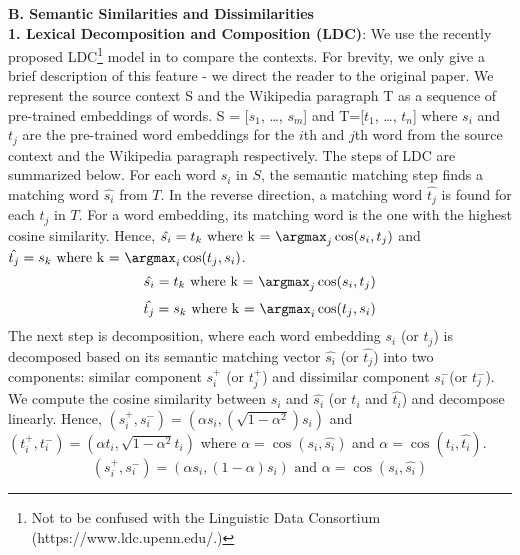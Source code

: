 \documentclass[letterpaper]{article} \usepackage{aaai18}  \usepackage{times}  \usepackage{helvet}  \usepackage{courier}  \usepackage{url}  \usepackage{graphicx}  \frenchspacing  \setlength{\pdfpagewidth}{8.5in}  \setlength{\pdfpageheight}{11in}  \usepackage{latexsym}
\DeclareMathOperator{\cosine}{cos}
\newcommand{\ct}{S}
\newcommand{\wpf}{T}
\newcommand{\cti}{s}
\newcommand{\wpfi}{t}
\begin{document}
\textbf{B. Semantic Similarities and Dissimilarities}\\
\textbf{1. Lexical Decomposition and Composition (LDC)}: We use the recently proposed LDC\footnote{Not to be confused with the Linguistic Data Consortium (https://www.ldc.upenn.edu/.)} model in \cite{wang2016sentence} to compare the contexts. For brevity, we only give a brief description of this feature - we direct the reader to the original paper. We represent the source context \ct{} and the Wikipedia paragraph \wpf{} as a sequence of pre-trained embeddings of words. \ct{} = [$\cti{}_1$, \ldots, $\cti{}_m$] and \wpf{}=[$\wpfi{}_1$, \ldots, $\wpfi{}_n$] where $\cti{}_i$ and $\wpfi{}_j$ are the pre-trained word embeddings for the $i$th and $j$th word from the source context and the Wikipedia paragraph respectively.
The steps of LDC are summarized below.
For each word $\cti{}_i$ in $\ct{}$, the semantic matching step finds a matching word $\hat{\cti{}_i}$ from $\wpf{}$. In the reverse direction, a matching word $\hat{\wpfi{}_j}$ is found for each $\wpfi{}_j$ in $\wpf{}$. For a word embedding, its matching word is the one with the highest cosine similarity. Hence, $\hat{\cti{}_i} = \wpfi{}_k \mbox{ where k = }\argmax_j \cosine(\cti{}_i,\wpfi{}_j)$ and $\hat{\wpfi{}_j} = \cti{}_k \mbox{ where k = }\argmax_i \cosine(\wpfi{}_j, \cti{}_i)$.
\begin{equation*}
\hat{\cti{}_i} = \wpfi{}_k \mbox{ where k = }\argmax_j \cosine(\cti{}_i,\wpfi{}_j) 
\end{equation*}
\begin{equation*}
\hat{\wpfi{}_j} = \cti{}_k \mbox{ where k = }\argmax_i \cosine(\wpfi{}_j, \cti{}_i)
\end{equation*}
The next step is decomposition, where each word embedding $\cti{}_i$ (or $\wpfi{}_j$) is decomposed based on its semantic matching vector $\hat{\cti{}_i}$ (or $\hat{\wpfi{}_j}$) into two components: similar component $\cti{}_i^{+}$ (or $\wpfi{}_j^{+}$) and dissimilar component $\cti{}_i^{-}$(or $\wpfi{}_j^{-}$). We compute the cosine similarity between $\cti{}_i$ and $\hat{\cti{}_i}$ (or $\wpfi{}_i$ and $\hat{\wpfi{}_i}$) and decompose linearly. Hence, $(\cti{}_i^{+},\cti{}_i^{-})=(\alpha \cti{}_i, (\sqrt{1-\alpha^2}) \cti{}_i)$ and $(\wpfi{}_i^{+},\wpfi{}_i^{-})=(\alpha \wpfi{}_i, \sqrt{1-\alpha^2} \wpfi{}_i)$ where $\alpha = \cosine(\cti{}_i,\hat{\cti{}_i})$ and $\alpha = \cosine(\wpfi{}_i,\hat{\wpfi{}_i})$.
\begin{equation*}
(\cti{}_i^{+},\cti{}_i^{-})=(\alpha \cti{}_i, (1-\alpha) \cti{}_i) \mbox{ and } \alpha = \cosine(\cti{}_i,\hat{\cti{}_i})
\end{equation*}
\end{document}
